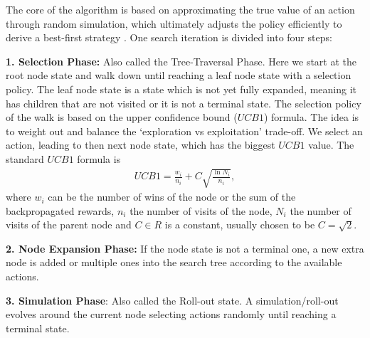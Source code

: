 The core of the algorithm is based on approximating the true
value of an action through random simulation, which ultimately adjusts the
policy efficiently to derive a best-first strategy \cite{mcts_survey}. One
search iteration is divided into four steps:
\newline

\textbf{1. Selection Phase:} Also called the Tree-Traversal Phase. Here we
start at the root node state and walk down until reaching a leaf node state
with a selection policy. The leaf node state is a state which is not yet
fully expanded, meaning it has children that are not visited or it is not a
terminal state. The selection policy of the walk is based on the upper
confidence bound ($UCB1$) formula. The idea is to weight out and balance the
`exploration vs exploitation' trade-off. We select an action, leading to then
next node state, which has the biggest $UCB1$ value. The standard $UCB1$
\cite{sutton_barto} formula is
\begin{align}
    UCB1 = \frac{w_i}{n_i} + C \sqrt{\frac{\ln N_i}{n_i}},
\end{align}
where $w_i$ can be the number of wins of the node or the sum of the
backpropagated rewards, $n_i$ the number of visits of
the node, $N_i$ the number of visits of the parent node and $C\in R$ is a
constant, usually chosen to be $C = \sqrt{2}$.
\newline

\textbf{2. Node Expansion Phase:} If the node state is not a terminal one, a
new extra node is added or multiple ones into the search tree according to
the available actions.
\newline

\textbf{3. Simulation Phase}: Also called the Roll-out state. A
simulation/roll-out evolves around the current node selecting actions
randomly until reaching a terminal state.
\newline

